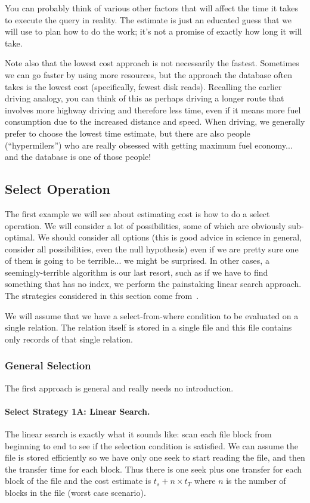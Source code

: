 You can probably think of various other factors that will affect the time it takes to execute the query in reality. The estimate is just an educated guess that we will use to plan how to do the work; it's not a promise of exactly how long it will take.

Note also that the lowest cost approach is not necessarily the fastest. Sometimes we can go faster by using more resources, but the approach the database often takes is the lowest cost (specifically, fewest disk reads). Recalling the earlier driving analogy, you can think of this as perhaps driving a longer route that involves more highway driving and therefore less time, even if it means more fuel consumption due to the increased distance and speed. When driving, we generally prefer to choose the lowest time estimate, but there are also people (``hypermilers'') who are really obsessed with getting maximum fuel economy... and the database is one of those people!

\subsection*{Select Operation}
The first example we will see about estimating cost is how to do a select operation. We will consider a lot of possibilities, some of which are obviously sub-optimal. We should consider all options (this is good advice in science in general, consider all possibilities, even the null hypothesis) even if we are pretty sure one of them is going to be terrible... we might be surprised. In other cases, a seemingly-terrible algorithm is our last resort, such as if we have to find something that has no index, we perform the painstaking linear search approach. The strategies considered in this section come from~\cite{dsc}.

We will assume that we have a select-from-where condition to be evaluated on a single relation.  The relation itself is stored in a single file and this file contains only records of that single relation. 

\subsubsection*{General Selection}

The first approach is general and really needs no introduction.

\paragraph{Select Strategy 1A: Linear Search.} The linear search is exactly what it sounds like: scan each file block from beginning to end to see if the selection condition is satisfied. We can assume the file is stored efficiently so we have only one seek to start reading the file, and then the transfer time for each block. Thus there is one seek plus one transfer for each block of the file and the cost estimate is $t_{s} + n \times t_{T}$ where $n$ is the number of blocks in the file (worst case scenario). 

